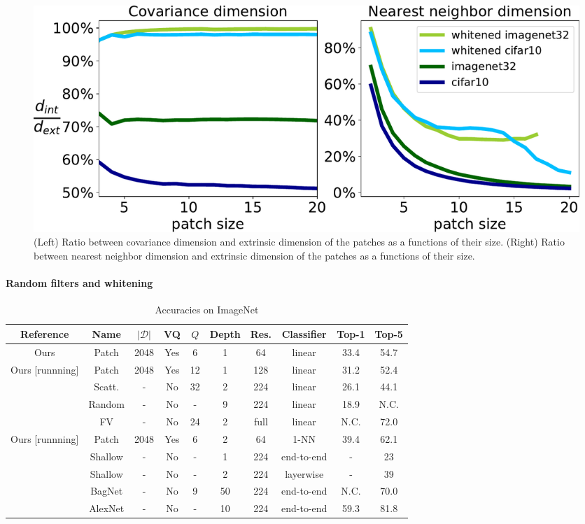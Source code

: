 \documentclass{article}
\begin{document}
{\begin{figure}\label{fig:intrinsic_dim}
	\includegraphics[width=.95\linewidth]{figures/intrinsic_dims}
	\caption{(Left) Ratio between covariance dimension and extrinsic dimension of the patches as a functions of their size. (Right) Ratio between nearest neighbor dimension and extrinsic dimension of the patches as a functions of their size.}
\end{figure}
\paragraph{Random filters and whitening}

\begin{table}[h]
  \caption{Accuracies on ImageNet}
  \label{accuracy}
  \centering
  \begin{tabular}{|c|c|c|c|c|c|c|c|c|c|}
    \hline 
    Reference&Name& $|\mathcal{D}|$&VQ & $Q$ & Depth & Res. & Classifier & Top-1&Top-5 \\
    \hline 
    \hline
    Ours&Patch&2048&Yes & 6 & 1 & 64 & linear & 33.4 &  54.7 \\
    \hdashline[0.5pt/1pt]
    Ours [runnning] &Patch&2048&Yes & 12 & 1 & 128 & linear & 31.2  &  52.4 \\
    \hdashline[0.5pt/1pt]
    \cite{zarka2019deep}&Scatt. & -&No & 32 & 2 & 224 & linear & 26.1  & 44.1 \\
    \hdashline[0.5pt/1pt]
    \cite{arandjelovic2017look}&Random & - &No& - &9 & 224 & linear & 18.9  & N.C.\\
    \hline
    \cite{sanchez2013image} & FV& - &No& 24 & 2 & full& linear & N.C. & 72.0\\
    \hline
     Ours [runnning]&Patch&2048 &Yes & 6 & 2 & 64 & 1-NN & 39.4 &  62.1 \\
     \hdashline[0.5pt/1pt]
   \cite{belilovsky2018greedy}&Shallow&-&No&-&1&224&end-to-end&-&23\\
    \hdashline[0.5pt/1pt]
   \cite{belilovsky2018greedy}&Shallow&-&No&-&2&224&layerwise&-&39\\
   \hline
   \cite{brendel2019approximating} & BagNet & - &No& 9 & 50 & 224 & end-to-end & N.C. & 70.0
    \\
    \hdashline[0.5pt/1pt]
    \cite{krizhevsky2012imagenet}& AlexNet&-&No&-&10&224&end-to-end&59.3&81.8\\
   \hline
  \end{tabular}
\end{table}








}
\end{document}
